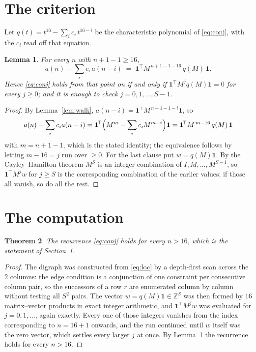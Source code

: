 \documentclass[11pt,a4paper]{article}
\theoremstyle{plain}
\newtheorem{theorem}{Theorem}
\newtheorem{lemma}[theorem]{Lemma}
\theoremstyle{definition}
\begin{document}
\section{The criterion}

Let $q(t)=t^{16}-\sum_i c_i\,t^{16-i}$ be the characteristic polynomial of
\eqref{eq:conj}, with the $c_i$ read off that equation.

\begin{lemma}\label{lem:crit}
For every $n$ with $n+1-1\ge16$,
\[
a(n)-\sum_i c_i\,a(n-i)\;=\;\mathbf{1}^{\!\top}M^{\,n+1-1-16}\,q(M)\,\mathbf{1} .
\]
Hence \eqref{eq:conj} holds from that point on if and only if
$\mathbf{1}^{\!\top}M^{j}q(M)\mathbf{1}=0$ for every $j\ge0$; and it is enough to check
$j=0,1,\dots,S-1$.
\end{lemma}

\begin{proof}
By Lemma~\ref{lem:walk}, $a(n-i)=\mathbf{1}^{\!\top}M^{\,n+1-1-i}\mathbf{1}$, so
\[
a(n)-\sum_i c_i a(n-i)
=\mathbf{1}^{\!\top}\Bigl(M^{m}-\sum_i c_i M^{m-i}\Bigr)\mathbf{1}
=\mathbf{1}^{\!\top}M^{\,m-16}\,q(M)\,\mathbf{1}
\]
with $m=n+1-1$, which is the stated identity; the equivalence follows by letting
$m-16=j$ run over $\ge0$. For the last clause put $w=q(M)\mathbf{1}$. By the
Cayley--Hamilton theorem $M^{S}$ is an integer combination of $I,M,\dots,M^{S-1}$, so
$\mathbf{1}^{\!\top}M^{j}w$ for $j\ge S$ is the corresponding combination of the earlier
values; if those all vanish, so do all the rest.
\end{proof}

\section{The computation}

\begin{theorem}
The recurrence \eqref{eq:conj} holds for every $n>16$, which is the statement of
Section~1.
\end{theorem}

\begin{proof}
The digraph was constructed from \eqref{eq:loc} by a depth-first scan across the $2$
columns: the edge condition is a conjunction of one constraint per consecutive column
pair, so the successors of a row $r$ are enumerated column by column without testing all
$S^2$ pairs. The vector $w=q(M)\mathbf{1}\in\mathbb{Z}^{S}$ was then formed by $16$
matrix--vector products in exact integer arithmetic, and $\mathbf{1}^{\!\top}M^{j}w$ was
evaluated for $j=0,1,\dots$, again exactly. Every one of those integers vanishes from the
index corresponding to $n=16+1$ onwards, and the run continued until $w$ itself was the
zero vector, which settles every larger $j$ at once. By Lemma~\ref{lem:crit} the recurrence
holds for every $n>16$.
\end{proof}
\end{document}
